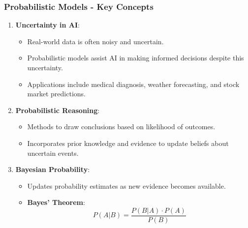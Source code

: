 \documentclass[aspectratio=169]{beamer}
\begin{document}
\begin{frame}[fragile]
    \frametitle{Probabilistic Models - Key Concepts}
    \begin{enumerate}
        \item \textbf{Uncertainty in AI}:
        \begin{itemize}
            \item Real-world data is often noisy and uncertain. 
            \item Probabilistic models assist AI in making informed decisions despite this uncertainty.
            \item Applications include medical diagnosis, weather forecasting, and stock market predictions.
        \end{itemize}
        
        \item \textbf{Probabilistic Reasoning}:
        \begin{itemize}
            \item Methods to draw conclusions based on likelihood of outcomes.
            \item Incorporates prior knowledge and evidence to update beliefs about uncertain events.
        \end{itemize}
        
        \item \textbf{Bayesian Probability}:
        \begin{itemize}
            \item Updates probability estimates as new evidence becomes available.
            \item \textbf{Bayes' Theorem}:
            \begin{equation}
                P(A|B) = \frac{P(B|A) \cdot P(A)}{P(B)}
            \end{equation}
        \end{itemize}
    \end{enumerate}
\end{frame}
\end{document}
